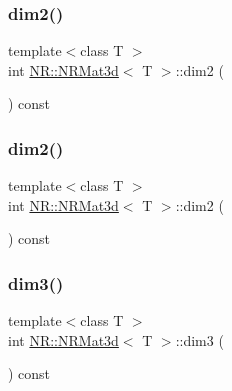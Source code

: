 \mbox{\label{classNR_1_1NRMat3d_a8c287b30748a7fdfc3f4424e26f88252}} 
\subsubsection{\texorpdfstring{dim2()}{dim2()}\hspace{0.1cm}{\footnotesize\ttfamily [1/2]}}
{\footnotesize\ttfamily template$<$class T $>$ \\
int \mbox{\hyperlink{classNR_1_1NRMat3d}{N\+R\+::\+N\+R\+Mat3d}}$<$ T $>$\+::dim2 (\begin{DoxyParamCaption}{ }\end{DoxyParamCaption}) const\hspace{0.3cm}{\ttfamily [inline]}}

\mbox{\label{classNR_1_1NRMat3d_a8c287b30748a7fdfc3f4424e26f88252}} 
\subsubsection{\texorpdfstring{dim2()}{dim2()}\hspace{0.1cm}{\footnotesize\ttfamily [2/2]}}
{\footnotesize\ttfamily template$<$class T $>$ \\
int \mbox{\hyperlink{classNR_1_1NRMat3d}{N\+R\+::\+N\+R\+Mat3d}}$<$ T $>$\+::dim2 (\begin{DoxyParamCaption}{ }\end{DoxyParamCaption}) const\hspace{0.3cm}{\ttfamily [inline]}}

\mbox{\label{classNR_1_1NRMat3d_aec8af45aa2025ea53f2967a79d0fe233}} 
\subsubsection{\texorpdfstring{dim3()}{dim3()}\hspace{0.1cm}{\footnotesize\ttfamily [1/2]}}
{\footnotesize\ttfamily template$<$class T $>$ \\
int \mbox{\hyperlink{classNR_1_1NRMat3d}{N\+R\+::\+N\+R\+Mat3d}}$<$ T $>$\+::dim3 (\begin{DoxyParamCaption}{ }\end{DoxyParamCaption}) const\hspace{0.3cm}{\ttfamily [inline]}}


